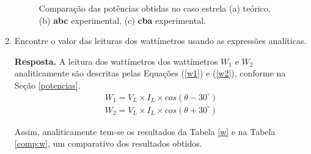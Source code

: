 \documentclass[a4paper,12pt,oneside,openany,table,xcdraw]{article}
\begin{document}
\begin{enumerate}[1)]
\begin{figure}[H]
\centering
\captionsetup{font=scriptsize}
\hfill
{}\hfill
{}
\caption{Comparação das potências obtidas no caso estrela (a) teórico, (b) \textbf{abc} experimental, (c) \textbf{cba} experimental.}
\label{pot-tab1}
\end{figure}


\item  Encontre o valor das leituras dos wattímetros usando as expressões analíticas. \vspace{0.8mm}

\textbf{Resposta.} A leitura dos wattímetros dos wattímetros $W_1$ e $W_2$ analiticamente são descritas pelas Equações (\ref{w1}) e (\ref{w2}), conforme na Seção \ref{potencias}.
\begin{gather}
W_1 = V_L \times I_L \times cos(\theta - 30^\circ)\label{w1}\\
W_2 = V_L \times I_L \times cos(\theta + 30^\circ)\label{w2}
\end{gather}

Assim, analiticamente tem-se os resultados da Tabela \ref{w} e na Tabela \ref{comp:w}, um comparativo dos resultados obtidos.


\end{enumerate}
\end{document}
